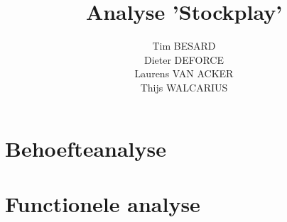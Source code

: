 \documentclass[a4paper,oneside]{report}
\title{Analyse 'Stockplay'}
\author{
Tim BESARD\\
Dieter DEFORCE\\
Laurens VAN ACKER\\
Thijs WALCARIUS
}
\begin{document}
\maketitle
{}
\tableofcontents
{}
\chapter{Behoefteanalyse}


\chapter{Functionele analyse}

\end{document}
